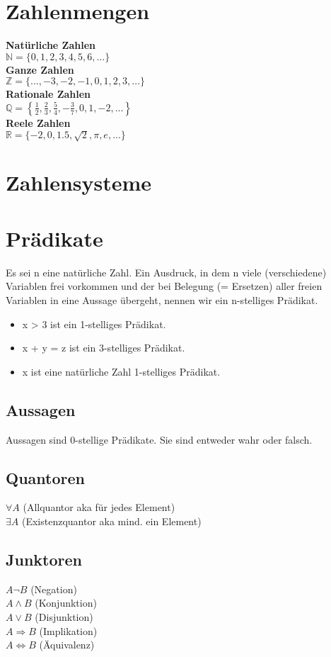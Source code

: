 \section{Zahlenmengen}
{\bf Natürliche Zahlen}\\
\(\mathbb{N} = \{0,1,2,3,4,5,6,...\}\) \\
{\bf Ganze Zahlen}\\
\(\mathbb{Z} = \{...,-3,-2,-1,0,1,2,3,...\}\) \\
{\bf Rationale Zahlen}\\
\(\mathbb{Q} = \left\{ \frac{1}{2}, \frac{2}{3}, \frac{5}{4}, -\frac{3}{7}, 0, 1, -2, ... \right\}\) \\
{\bf Reele Zahlen}\\
\(\mathbb{R} = \{ -2, 0, 1.5, \sqrt{2}, \pi, e, ... \}\)

\section{Zahlensysteme}

\section{Prädikate}
Es sei n eine natürliche Zahl. Ein Ausdruck, in dem n viele
(verschiedene) Variablen frei vorkommen und der bei Belegung (=
Ersetzen) aller freien Variablen in eine Aussage übergeht, nennen wir
ein n-stelliges Prädikat.
\begin{itemize}
    \item x > 3 ist ein 1-stelliges Prädikat.
    \item x + y = z ist ein 3-stelliges Prädikat.
    \item x ist eine natürliche Zahl 1-stelliges Prädikat.
\end{itemize}
\subsection{Aussagen}
Aussagen sind 0-stellige Prädikate. Sie sind entweder wahr oder falsch.
\subsection{Quantoren}
\(\forall A\) (Allquantor aka für jedes Element)\\
\(\exists A\) (Existenzquantor aka mind. ein Element)
\subsection{Junktoren}
\(A \neg B\) (Negation)\\
\(A \wedge B\) (Konjunktion)\\
\(A \vee B\) (Disjunktion)\\
\(A \Rightarrow B\) (Implikation)\\
\(A \Leftrightarrow B\) (Äquivalenz)

